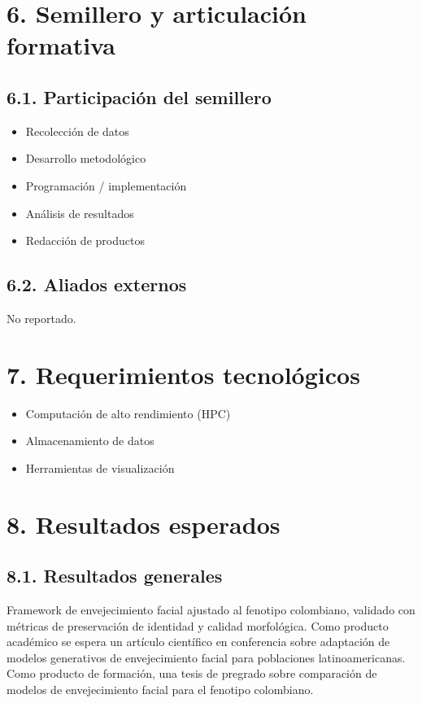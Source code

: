 \documentclass[a4paper,12pt]{article}
\begin{document}
\section*{6. Semillero y articulación formativa}
\subsection*{6.1. Participación del semillero}
\begin{itemize}
    \item Recolección de datos
    \item Desarrollo metodológico
    \item Programación / implementación
    \item Análisis de resultados
    \item Redacción de productos
\end{itemize}

\subsection*{6.2. Aliados externos}
No reportado.

\section*{7. Requerimientos tecnológicos}
\begin{itemize}
    \item Computación de alto rendimiento (HPC)
    \item Almacenamiento de datos
    \item Herramientas de visualización
\end{itemize}

\section*{8. Resultados esperados}
\subsection*{8.1. Resultados generales}
Framework de envejecimiento facial ajustado al fenotipo colombiano, validado con métricas de preservación de identidad y calidad morfológica. Como producto académico se espera un artículo científico en conferencia sobre adaptación de modelos generativos de envejecimiento facial para poblaciones latinoamericanas. Como producto de formación, una tesis de pregrado sobre comparación de modelos de envejecimiento facial para el fenotipo colombiano.
\end{document}
